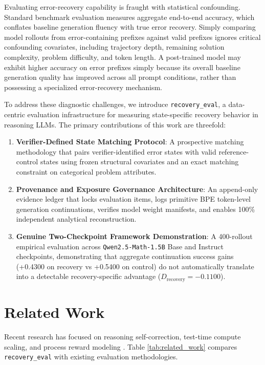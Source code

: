 \documentclass[10pt,conference,letterpaper]{IEEEtran}
\begin{document}
Evaluating error-recovery capability is fraught with statistical confounding. Standard benchmark evaluation measures aggregate end-to-end accuracy, which conflates baseline generation fluency with true error recovery. Simply comparing model rollouts from error-containing prefixes against valid prefixes ignores critical confounding covariates, including trajectory depth, remaining solution complexity, problem difficulty, and token length. A post-trained model may exhibit higher accuracy on error prefixes simply because its overall baseline generation quality has improved across all prompt conditions, rather than possessing a specialized error-recovery mechanism.

To address these diagnostic challenges, we introduce \texttt{recovery\_eval}, a data-centric evaluation infrastructure for measuring state-specific recovery behavior in reasoning LLMs. The primary contributions of this work are threefold:
\begin{enumerate}
    \item \textbf{Verifier-Defined State Matching Protocol}: A prospective matching methodology that pairs verifier-identified error states with valid reference-control states using frozen structural covariates and an exact matching constraint on categorical problem attributes.
    \item \textbf{Provenance and Exposure Governance Architecture}: An append-only evidence ledger that locks evaluation items, logs primitive BPE token-level generation continuations, verifies model weight manifests, and enables 100\% independent analytical reconstruction.
    \item \textbf{Genuine Two-Checkpoint Framework Demonstration}: A 400-rollout empirical evaluation across \texttt{Qwen2.5-Math-1.5B} Base and Instruct checkpoints, demonstrating that aggregate continuation success gains (+0.4300 on recovery vs +0.5400 on control) do not automatically translate into a detectable recovery-specific advantage ($D_{\text{recovery}} = -0.1100$).
\end{enumerate}

\section{Related Work}
Recent research has focused on reasoning self-correction, test-time compute scaling, and process reward modeling \cite{snell2024scaling, wang2022selfconsistency}. Table \ref{tab:related_work} compares \texttt{recovery\_eval} with existing evaluation methodologies.
\end{document}

